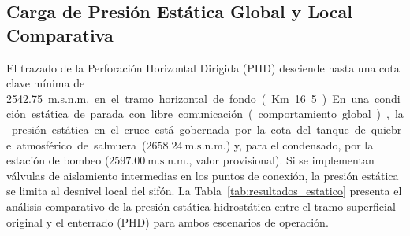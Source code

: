 \subsection{Carga de Presión Estática Global y Local Comparativa}
\label{ssec:res_estatico}

El trazado de la Perforación Horizontal Dirigida (PHD) desciende hasta una cota clave mínima de \SI{2542.75}{m.s.n.m.} en el tramo horizontal de fondo (Km 16.5). En una condición estática de parada con libre comunicación (comportamiento global), la presión estática en el cruce está gobernada por la cota del tanque de quiebre atmosférico de salmuera ($2658.24\ \text{m.s.n.m.}$) y, para el condensado, por la estación de bombeo ($2597.00\ \text{m.s.n.m.}$, valor provisional). Si se implementan válvulas de aislamiento intermedias en los puntos de conexión, la presión estática se limita al desnivel local del sifón. La Tabla~\ref{tab:resultados_estatico} presenta el análisis comparativo de la presión estática hidrostática entre el tramo superficial original y el enterrado (PHD) para ambos escenarios de operación.

